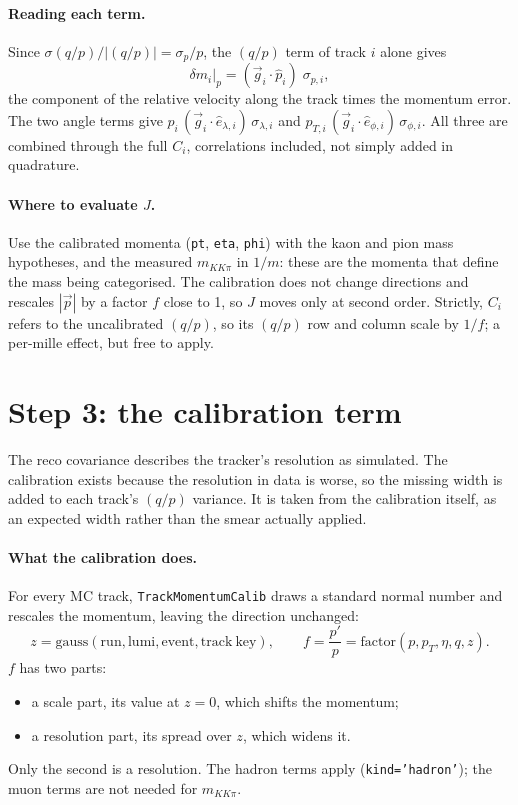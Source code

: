 \documentclass[11pt,a4paper]{article}
\newcommand{\qp}{(q/p)}
\newcommand{\vb}[1]{\vec{#1}}
\newcommand{\br}[1]{\texttt{#1}}
\newcommand{\mKKpi}{m_{KK\pi}}
\begin{document}
\paragraph{Reading each term.} Since $\sigma\qp/|\qp| = \sigma_p/p$, the $\qp$ term of track $i$ alone gives
\begin{equation}
  \delta m_i\big|_{p} = (\vb g_i\cdot\hat p_i)\;\sigma_{p,i},
\end{equation}
the component of the relative velocity along the track times the momentum error. The two angle terms give
$p_i\,(\vb g_i\cdot\hat e_{\lambda,i})\,\sigma_{\lambda,i}$ and
$p_{T,i}\,(\vb g_i\cdot\hat e_{\phi,i})\,\sigma_{\phi,i}$. All three are combined through the full $C_i$,
correlations included, not simply added in quadrature.

\paragraph{Where to evaluate $J$.} Use the calibrated momenta (\br{pt}, \br{eta}, \br{phi}) with the kaon and
pion mass hypotheses, and the measured $\mKKpi$ in $1/m$: these are the momenta that define the mass being
categorised. The calibration does not change directions and rescales $|\vb p|$ by a factor $f$ close to 1,
so $J$ moves only at second order. Strictly, $C_i$ refers to the uncalibrated $\qp$, so its $\qp$ row and
column scale by $1/f$; a per-mille effect, but free to apply.

\section{Step 3: the calibration term}

The reco covariance describes the tracker's resolution as simulated. The calibration exists because the
resolution in data is worse, so the missing width is added to each track's $\qp$ variance. It is taken from
the calibration itself, as an expected width rather than the smear actually applied.

\paragraph{What the calibration does.} For every MC track, \br{TrackMomentumCalib} draws a standard
normal number and rescales the momentum, leaving the direction unchanged:
\begin{equation*}
  z = \mathrm{gauss}(\mathrm{run}, \mathrm{lumi}, \mathrm{event}, \mathrm{track\ key}), \qquad
  f = \frac{p'}{p} = \mathrm{factor}(p, p_T, \eta, q, z).
\end{equation*}
$f$ has two parts:
\begin{itemize}
  \item a scale part, its value at $z=0$, which shifts the momentum;
  \item a resolution part, its spread over $z$, which widens it.
\end{itemize}
Only the second is a resolution. The hadron terms apply (\br{kind='hadron'}); the muon terms are not needed
for $\mKKpi$.
\end{document}
